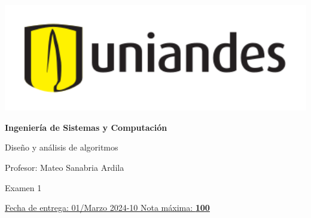 \documentclass[12pt, a4paper]{exam}
\begin{document}
	\noindent
	\begin{minipage}[l]{0.1\textwidth}
		\noindent
		\includegraphics[width=1.8\textwidth]{Logosimbolo-uniandes_horizontal.png}
	\end{minipage}
\hfill
\begin{minipage}[c]{0.8\textwidth}
	\begin{center}
		{\large \textbf{Ingeniería de Sistemas y Computación} \par
		\large	Diseño y análisis de algoritmos	\par
		\small  Profesor: Mateo Sanabria Ardila	\par
		\small  Examen 1	\par
		}
	\end{center}
\end{minipage}
\par
\vspace{0.2in}
\noindent
\uline{Fecha de entrega: 01/Marzo 	\hfill  2024-10		\hfill Nota máxima: \textbf{100} }
\par 
\vspace{0.15in}
\end{document}
